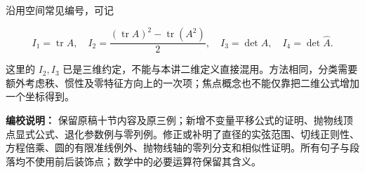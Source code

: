 \documentclass[11pt,a4paper]{article}
\begin{document}
沿用空间常见编号，可记

\begin{equation*}
I_1=\operatorname{tr}A,\quad I_2=\frac{(\operatorname{tr}A)^2-\operatorname{tr}(A^2)}2,\quad I_3=\det A,\quad I_4=\det\widehat A.
\end{equation*}

这里的 \(I_2,I_3\)
已是三维约定，不能与本讲二维定义直接混用。方法相同，分类需要额外考虑秩、惯性及零特征方向上的一次项；焦点概念也不能仅靠把二维公式增加一个坐标得到。

\textbf{编校说明：}
保留原稿十节内容及原三例；新增不变量平移公式的证明、抛物线顶点显式公式、退化参数例与零列例。修正或补明了直径的实弦范围、切线正则性、方程倍乘、圆的有限准线例外、抛物线轴的零列分支和相似性证明。所有句子与段落均不使用前后装饰点；数学中的必要运算符保留其含义。
\end{document}
